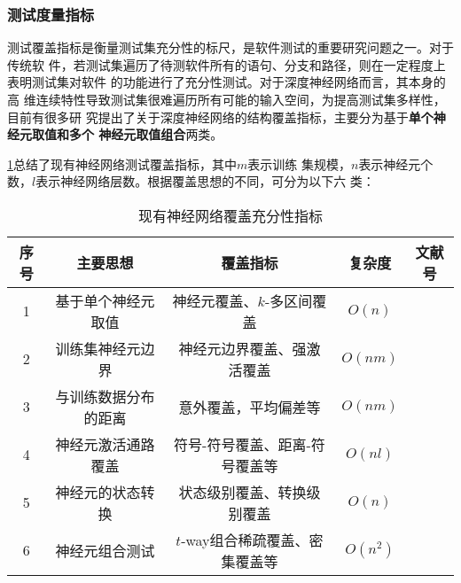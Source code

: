 \subsubsection{测试度量指标}
{测试覆盖指标是衡量测试集充分性的标尺，是软件测试的重要研究问题之一。}对于传统软
件，若测试集遍历了待测软件所有的语句、分支和路径，则在一定程度上表明测试集对软件
的功能进行了充分性测试。对于深度神经网络而言，其本身的高
维连续特性导致测试集很难遍历所有可能的输入空间，为提高测试集多样性，目前有很多研
究提出了关于深度神经网络的结构覆盖指标，主要分为基于\textbf{单个神经元取值和多个
神经元取值组合}两类。



\iffalse
\cref{tab:coverage_criteria}总结了现有神经网络测试覆盖指标，其中$m$表示训练
集规模，$n$表示神经元个数，$l$表示神经网络层数。根据覆盖思想的不同，可分为以下六
类：

\begin{table}[htp]
	\renewcommand\arraystretch{1.5}
	\small
	\centering
	\caption{现有神经网络覆盖充分性指标}
	\label{tab:coverage_criteria}
	\begin{tabular}{ccccc}
		\toprule
		\textbf{序号} & \textbf{主要思想} & \textbf{覆盖指标}       & \textbf{复杂度} & \textbf{文献号}                                                  \\
		\midrule
		1             & 基于单个神经元取值  & 神经元覆盖、$k$-多区间覆盖                    & $O(n)$          & \cite{ma2018deepgauge}\cite{Pei2019DeepXplore} \\
		2             & 训练集神经元边界  & 神经元边界覆盖、强激活覆盖                    & $O(nm)$          & \cite{ma2018deepgauge}                                           \\
		3             & 与训练数据分布的距离  & 意外覆盖，平均偏差等                & $O(nm)$         & \cite{Kim2019Guiding}\cite{Tian2019Testing}            \\
		4             & 神经元激活通路覆盖    & 符号-符号覆盖、距离-符号覆盖等 & $O(nl)$ & \cite{Wang2019DeepPath}\cite{Sun2018Testing} \\
		5             & 神经元的状态转换        & 状态级别覆盖、转换级别覆盖                         & $O(n)$          & \cite{Du2018DeepCruiser}                                         \\
		6             & 神经元组合测试    & $t$-way组合稀疏覆盖、密集覆盖等 & $O(n^2)$ & \cite{ma2019deepct} \\
		\bottomrule
	\end{tabular}
\end{table}


